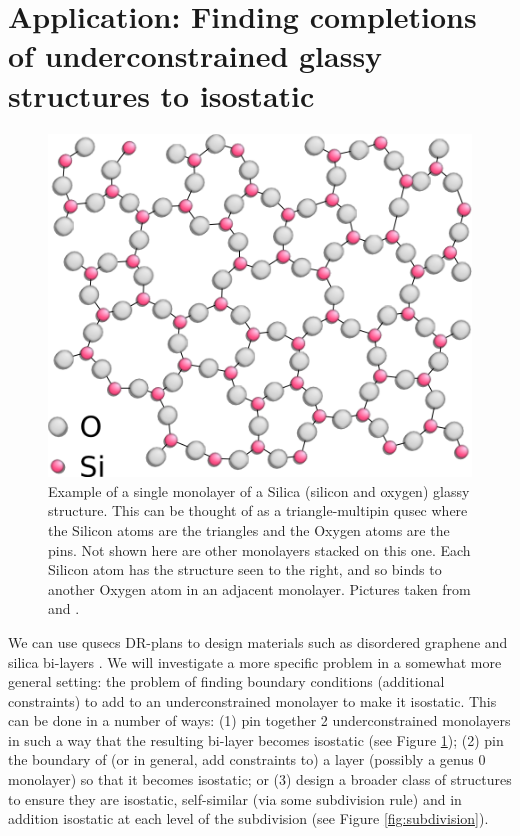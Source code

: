\section{Application: Finding completions of underconstrained glassy structures to isostatic}
\label{sec:bodypin}
% 


\begin{figure}\centering
    \includegraphics[width=0.4\linewidth]{img/Silica} \hspace{0.5cm}
    \caption{Example of a single monolayer of a Silica (silicon and oxygen)
    glassy structure. This can be thought of as a triangle-multipin qusec
where the Silicon atoms are the triangles and the Oxygen atoms are the pins.
Not shown here are other monolayers stacked on this one. Each Silicon atom
has the structure seen to the right, and so binds to another Oxygen atom in
an adjacent monolayer. Pictures taken from \cite{silica_figure} and \cite{tetra_silica_figure}.}
    \label{fig:silica_glass}
\end{figure}


We can use qusecs DR-plans to design materials such as disordered
graphene and silica bi-layers \cite{silica_bilayers}
\cite{sructure_of_2d_glass}. We will investigate a more specific problem in
a somewhat more general setting:
the problem of finding boundary conditions (additional constraints) to
add to an underconstrained monolayer to make it
isostatic.
This can be done in a number of ways:
(1) pin together 2 underconstrained monolayers in such a way that the resulting bi-layer becomes isostatic (see Figure \ref{fig:silica_glass});
(2) pin the boundary of (or in general, add constraints to) a layer (possibly a genus 0 monolayer) so that it becomes isostatic; or
(3) design a broader class of structures to ensure they are isostatic, self-similar (via some subdivision rule) and in addition isostatic at each level of the subdivision (see Figure \ref{fig:subdivision}).

